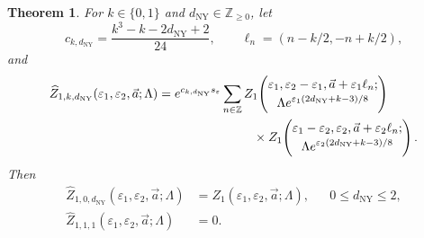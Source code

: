\documentclass{amsart}
\newtheorem{theorem}{Theorem}
\theoremstyle{definition}
\numberwithin{equation}{section}
\newcommand{\Z}{\mathbb Z}
\newcommand{\eps}{\varepsilon}
\begin{document}
\begin{theorem}
\label{thm:NY-native}
For \(k\in\{0,1\}\) and \(d_{\mathrm{NY}}\in\Z_{\geq0}\), let
\[
 c_{k,d_{\mathrm{NY}}}
 =\frac{k^3-k-2d_{\mathrm{NY}}+2}{24},\qquad
 \ell_n=(n-k/2,-n+k/2),
\]
and
\begin{equation}
\begin{aligned}
 \widehat Z_{1,k,d_{\mathrm{NY}}}
 (\eps_1,\eps_2,\vec a;\Lambda)
 ={}&e^{c_{k,d_{\mathrm{NY}}}s_\eps}
 \sum_{n\in\Z}
 Z_1\!\left(
 \begin{gathered}
 \eps_1,\eps_2-\eps_1,\vec a+\eps_1\ell_n;\\[-2pt]
 \Lambda e^{\eps_1(2d_{\mathrm{NY}}+k-3)/8}
 \end{gathered}\right)\\
 &\hspace{22mm}\times
 Z_1\!\left(
 \begin{gathered}
 \eps_1-\eps_2,\eps_2,\vec a+\eps_2\ell_n;\\[-2pt]
 \Lambda e^{\eps_2(2d_{\mathrm{NY}}+k-3)/8}
 \end{gathered}\right).
\end{aligned}
\label{eq:NY-native-additive}
\end{equation}
Then
\begin{equation}
\begin{aligned}
 \widehat Z_{1,0,d_{\mathrm{NY}}}
 (\eps_1,\eps_2,\vec a;\Lambda)
 &=Z_1(\eps_1,\eps_2,\vec a;\Lambda),
 &&0\leq d_{\mathrm{NY}}\leq2,\\
 \widehat Z_{1,1,1}(\eps_1,\eps_2,\vec a;\Lambda)&=0.
\end{aligned}
\label{eq:NY-unity-vanishing}
\end{equation}
\end{theorem}
\end{document}
